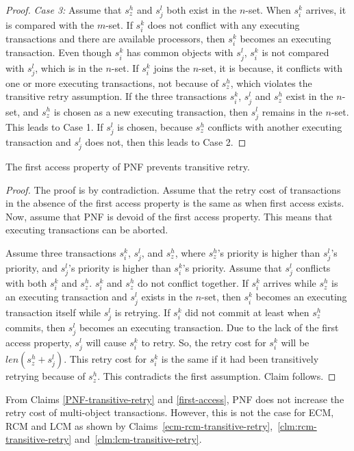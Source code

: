 \begin{proof}
\textit{Case 3:} Assume that $s_{z}^{h}$ and $s_{j}^{l}$ both exist in the $n$-set.
When $s_{i}^{k}$ arrives, it is compared with the $m$-set. If $s_{i}^{k}$ does not conflict with any executing transactions and there are available processors, then $s_{i}^{k}$ becomes an executing transaction. 
Even though $s_{i}^{k}$ has common objects with $s_{j}^{l}$, $s_{i}^{k}$ is not compared with $s_{j}^{l}$, which is in the $n$-set. If $s_{i}^{k}$ joins the $n$-set, it is because, it conflicts with one or more executing transactions, not because of $s_{z}^{h}$, which violates the transitive retry assumption.
If the three transactions $s_i^k$, $s_j^l$ and $s_z^h$ exist in the $n$-set, and  $s_{z}^{h}$ is chosen as a new executing transaction, then $s_{j}^{l}$ remains in the $n$-set. This leads to
Case 1. If $s_{j}^{l}$ is chosen, because $s_{z}^{h}$ conflicts
with another executing transaction and $s_{j}^{l}$ does not, then
this leads to Case 2.
%
\end{proof}
%
\begin{clm}\label{first-access}
The first access property of PNF prevents transitive retry.
\end{clm}
%
\begin{proof}\normalfont
The proof is by contradiction. Assume that the retry cost of transactions
in the absence of the first access property is the same as when first access  exists. Now, assume that PNF is devoid of the first access property.  This means that executing transactions can be aborted. 

Assume three transactions $s_{i}^{k}$, $s_{j}^{l}$, and $s_{z}^{h}$, where $s_{z}^{h}$'s priority is higher than $s_{j}^{l}$'s priority, and $s_j^l$'s priority is higher than $s_{i}^{k}$'s priority. Assume that $s_{j}^{l}$ conflicts with both $s_{i}^{k}$ and $s_{z}^{h}$. 
$s_{i}^{k}$ and $s_{z}^{h}$ do not conflict together. If $s_{i}^{k}$
arrives while $s_{z}^{h}$ is an executing transaction and $s_{j}^{l}$
exists in the $n$-set, then $s_{i}^{k}$ becomes an executing transaction itself while $s_{j}^{l}$ is retrying. If $s_{i}^{k}$ did not commit at least when $s_{z}^{h}$ commits, then $s_{j}^{l}$ becomes an executing transaction. 
Due to the lack of the first access property, $s_{j}^{l}$ will cause $s_{i}^{k}$ to retry. So, the retry cost for $s_{i}^{k}$ will be $len(s_{z}^{h}+s_{j}^{l})$. This
retry cost for $s_{i}^{k}$ is the same if it had been transitively
retrying because of $s_{z}^{h}$. 
This contradicts the first
assumption. Claim follows.
\end{proof}
%
From Claims \ref{PNF-transitive-retry} and \ref{first-access}, PNF does not increase the retry cost of multi-object transactions. However, this is not the case for ECM, RCM and LCM as shown by Claims~\ref{ecm-rcm-transitive-retry},~\ref{clm:rcm-transitive-retry} and~\ref{clm:lcm-transitive-retry}.
